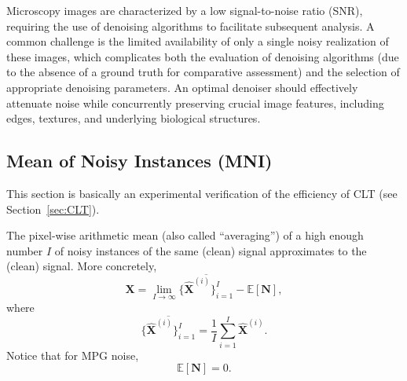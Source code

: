 \documentclass{article}
\begin{document}

Microscopy images are characterized by a low signal-to-noise ratio
(SNR), requiring the use of denoising algorithms to facilitate
subsequent analysis. A common challenge is the limited availability of
only a single noisy realization of these images, which complicates
both the evaluation of denoising algorithms (due to the absence of a
ground truth for comparative assessment) and the selection of
appropriate denoising parameters. An optimal denoiser should
effectively attenuate noise while concurrently preserving crucial
image features, including edges, textures, and underlying biological
structures.

\subsection{Mean of Noisy Instances (MNI)}

This section is basically an experimental verification of the
efficiency of CLT (see Section~\ref{sec:CLT}).

The pixel-wise arithmetic mean (also called ``averaging'') of a high
enough number $I$ of noisy instances of the same (clean) signal
approximates to the (clean) signal. More concretely,
\begin{equation}
  {\mathbf X} = \lim_{I \to \infty} \overline{\{\hat{\mathbf X}^{(i)}\}_{i=1}^I}  - \mathbb{E}\left[\mathbf{N}\right],
  \label{eq:mean_with_bias}
\end{equation}
where
\begin{equation}
  \overline{\{\hat{\mathbf X}^{(i)}\}_{i=1}^I} = \frac{1}{I} \sum_{i=1}^I \hat{\mathbf X}^{(i)}.
  \label{eq:mean}
\end{equation}
Notice that for MPG noise,
\begin{equation}
  \mathbb{E}\left[\mathbf{N}\right] = 0.
\end{equation}
\end{document}
